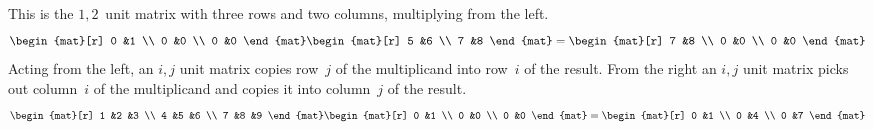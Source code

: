 \begin{example}
This is the \( 1,2\, \) unit matrix with three rows and two columns,
multiplying from the left.
\begin{equation*}
    \begin{mat}[r]
       0  &1  \\
       0  &0  \\
       0  &0
    \end{mat}
    \begin{mat}[r]
       5  &6  \\
       7  &8
    \end{mat}
  =
    \begin{mat}[r]
       7  &8  \\
       0  &0  \\
       0  &0
    \end{mat}
\end{equation*}
Acting
from the left, an \( i,j \) unit matrix copies row~\( j \) of
the multiplicand into row~\( i \) of the result.
From the right an \( i,j \) unit matrix picks out column~\( i \) of
the multiplicand and copies it into column~\( j \) of the result.
\begin{equation*}
    \begin{mat}[r]
       1  &2  &3  \\
       4  &5  &6  \\
       7  &8  &9
    \end{mat}
    \begin{mat}[r]
       0  &1  \\
       0  &0  \\
       0  &0
    \end{mat}
  =
    \begin{mat}[r]
       0  &1  \\
       0  &4  \\
       0  &7
    \end{mat}
\end{equation*}
\end{example}

